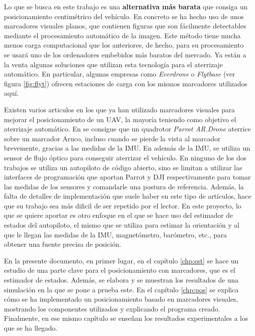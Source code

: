 Lo que se busca en este trabajo es una \textbf{alternativa más barata} que consiga un posicionamiento centimétrico del vehículo. En concreto se ha hecho uso de unos marcadores visuales planos, que contienen figuras que son fácilmente detectables mediante el procesamiento automático de la imagen. Este método tiene mucha menos carga computacional que los anteriores, de hecho, para su procesamiento se usará uno de los ordenadores embebidos más baratos del mercado.
Ya están a la venta algunas soluciones que utilizan esta tecnología para el aterrizaje automático. En particular, algunas  empresas como \textit{Everdrone} \cite{everdrone} o \textit{Flytbase} (ver figura \ref{fig:flyt}) ofrecen estaciones de carga con los mismos marcadores utilizados aquí. 

Existen varios articulos en los que ya han utilizado marcadores visuales para mejorar el posicionamiento de un UAV, la mayoría teniendo como objetivo el aterrizaje automático. En \cite{sani2017automatic} se consigue que un quadrotor \textit{Parrot AR.Drone} aterrice sobre un marcador Aruco, incluso cuando se pierde la vista al marcador brevemente, gracias a las medidas de la IMU. En \cite{yang2015precise} además de la IMU, se utiliza un sensor de flujo óptico para conseguir aterrizar el vehículo. En ninguno de los dos trabajos se utiliza un autopiloto de código abierto, sino se limitan a utilizar las interfaces de programación que aportan Parrot y DJI respectivamente para tomar las medidas de los sensores y comandarle una postura de referencia. 
Además, la falta de detalles de implementación que suele haber en este tipo de artículos, hace que su trabajo sea más dificil de ser repetido por el lector.
En este proyecto, lo que se quiere aportar es otro enfoque en el que se hace uso del estimador de estados del autopiloto, el mismo que se utiliza para estimar la orientación y al que le llegan las medidas de la IMU, magnetómetro, barómetro, etc., para obtener una fuente precisa de posición.  

En la presente documento, en primer lugar, en el capítulo \ref{chp:est} se hace un estudio de una parte clave para el posicionamiento con marcadores, que es el estimador de estados. Además, se elabora y se muestran los resultados de una simulación en la que se pone a prueba este. En el capítulo \ref{chp:pos} se explica cómo se ha implementado un posicionamiento basado en marcadores visuales, mostrando los componentes utilizados y explicando el programa creado. Finalmente, en ese mismo capítulo se enseñan los resultados experimentales a los que se ha llegado.  



\endinput
